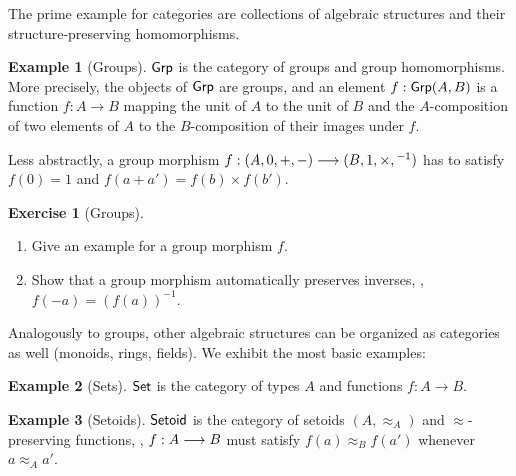 \documentclass[a4paper,fleqn]{scrartcl}
\theoremstyle{definition}
\newtheorem{example}{Example}
\newtheorem{exercise}{Exercise}
\begin{document}
The prime example for categories are collections of algebraic
structures and their structure-preserving homomorphisms.
\begin{example}[Groups]
  $\mathsf{Grp}$ is the category of groups and group homomorphisms.  More
  precisely, the objects of $\mathsf{Grp}$ are groups, and an element
  $f : \mathsf{Grp}(A,B)$ is a function $f : A \to B$ mapping the unit of $A$
  to the unit of $B$ and the $A$-composition of two elements of $A$ to
  the $B$-composition of their images under $f$.

  Less abstractly, a group morphism $f : (A,0,+,-) \longrightarrow (B,1,\times,{}^{-1})$
  has to satisfy $f(0) = 1$ and $f(a+a') = f(b) \times f(b')$.
\end{example}
\begin{exercise}[Groups] \bla
  \begin{enumerate}
  \item
  Give an example for a group morphism $f$.
  \item
  Show that a group morphism automatically preserves inverses, \ie,
  $f(-a) = (f(a))^{-1}$.
  \end{enumerate}
\end{exercise}
Analogously to groups, other algebraic structures can be organized as
categories as well (monoids, rings, fields).  We exhibit the most
basic examples:
\begin{example}[Sets]
  $\mathsf{Set}$ is the category of types $A$ and functions $f : A \to B$.
\end{example}
\begin{example}[Setoids]
  $\mathsf{Setoid}$ is the category of setoids $(A,\approx_A)$ and
  $\approx$-preserving functions, \ie, $f : A \longrightarrow B$ must satisfy
  $f(a) \approx_B f(a')$ whenever $a \approx_A a'$.
\end{example}
\end{document}
